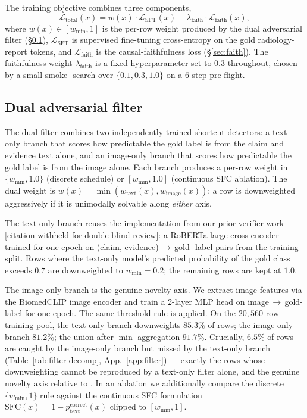 \documentclass{article}
\begin{document}
The training objective combines three components,
\begin{equation}
\mathcal{L}_{\mathrm{total}}(x) = w(x)\cdot\mathcal{L}_{\mathrm{SFT}}(x) +
\lambda_{\mathrm{faith}}\cdot\mathcal{L}_{\mathrm{faith}}(x),
\end{equation}
where $w(x)\in[w_{\min},1]$ is the per-row weight produced by the dual
adversarial filter (\S\ref{sec:dual}), $\mathcal{L}_{\mathrm{SFT}}$ is
supervised fine-tuning cross-entropy on the gold radiology-report tokens,
and $\mathcal{L}_{\mathrm{faith}}$ is the causal-faithfulness loss
(\S\ref{sec:faith}). The faithfulness weight $\lambda_{\mathrm{faith}}$ is
a fixed hyperparameter set to $0.3$ throughout, chosen by a small smoke-
search over $\{0.1, 0.3, 1.0\}$ on a 6-step pre-flight.

\subsection{Dual adversarial filter}
\label{sec:dual}

The dual filter combines two independently-trained shortcut detectors: a
text-only branch that scores how predictable the gold label is from the
claim and evidence text alone, and an image-only branch that scores how
predictable the gold label is from the image alone. Each branch produces
a per-row weight in $\{w_{\min}, 1.0\}$ (discrete schedule) or
$[w_{\min}, 1.0]$ (continuous SFC ablation). The dual weight is
$w(x) = \min(w_{\text{text}}(x), w_{\text{image}}(x))$: a row is
downweighted aggressively if it is unimodally solvable along \emph{either}
axis.

The text-only branch reuses the implementation from our prior verifier
work [citation withheld for double-blind review]: a RoBERTa-large
cross-encoder trained for one epoch on (claim, evidence)\,$\to$\,gold-
label pairs from the training split. Rows where the text-only model's
predicted probability of the gold class exceeds $0.7$ are downweighted
to $w_{\min} = 0.2$; the remaining rows are kept at $1.0$.

The image-only branch is the genuine novelty axis. We extract image
features via the BiomedCLIP image encoder \citep{zhang2024biomedclip} and
train a 2-layer MLP head on image\,$\to$\,gold-label for one epoch. The
same threshold rule is applied. On the $20{,}560$-row training pool, the
text-only branch downweights $85.3\%$ of rows; the image-only branch
$81.2\%$; the union after $\min$ aggregation $91.7\%$. Crucially,
$\mathbf{6.5\%}$ of rows are caught by the image-only branch but missed
by the text-only branch (Table~\ref{tab:filter-decomp}, App.~\ref{app:filter})
--- exactly the rows whose downweighting cannot be reproduced by a
text-only filter alone, and the genuine novelty axis relative to
\citet{li2025sfc}. In an ablation we additionally compare the discrete
$\{w_{\min},1\}$ rule against the continuous SFC formulation
$\mathrm{SFC}(x) = 1 - p_{\text{text}}^{\text{correct}}(x)$ clipped to
$[w_{\min}, 1]$.
\end{document}
